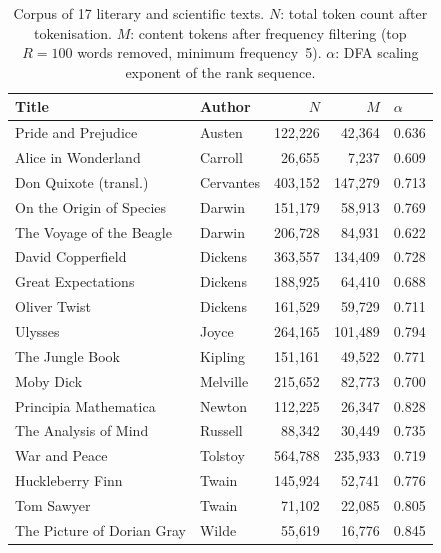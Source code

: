 \documentclass[12pt,a4paper]{article}
\begin{document}
\begin{table}[t]
\centering
\caption{Corpus of 17 literary and scientific texts.
$N$: total token count after tokenisation.
$M$: content tokens after frequency filtering
(top $R=100$ words removed, minimum frequency~5).
$\alpha$: DFA scaling exponent of the rank sequence.}
\label{tab:corpus}
\small
\begin{tabular}{llrrl}
\toprule
Title & Author & $N$ & $M$ & $\alpha$ \\
\midrule
Pride and Prejudice                      & Austen       &    122{,}226 &     42{,}364 & 0.636 \\
Alice in Wonderland                      & Carroll      &     26{,}655 &      7{,}237 & 0.609 \\
Don Quixote (transl.)                    & Cervantes    &    403{,}152 &    147{,}279 & 0.713 \\
On the Origin of Species                 & Darwin       &    151{,}179 &     58{,}913 & 0.769 \\
The Voyage of the Beagle                 & Darwin       &    206{,}728 &     84{,}931 & 0.622 \\
David Copperfield                        & Dickens      &    363{,}557 &    134{,}409 & 0.728 \\
Great Expectations                       & Dickens      &    188{,}925 &     64{,}410 & 0.688 \\
Oliver Twist                             & Dickens      &    161{,}529 &     59{,}729 & 0.711 \\
Ulysses                                  & Joyce        &    264{,}165 &    101{,}489 & 0.794 \\
The Jungle Book                          & Kipling      &    151{,}161 &     49{,}522 & 0.771 \\
Moby Dick                                & Melville     &    215{,}652 &     82{,}773 & 0.700 \\
Principia Mathematica                    & Newton       &    112{,}225 &     26{,}347 & 0.828 \\
The Analysis of Mind                     & Russell      &     88{,}342 &     30{,}449 & 0.735 \\
War and Peace                            & Tolstoy      &    564{,}788 &    235{,}933 & 0.719 \\
Huckleberry Finn                         & Twain        &    145{,}924 &     52{,}741 & 0.776 \\
Tom Sawyer                               & Twain        &     71{,}102 &     22{,}085 & 0.805 \\
The Picture of Dorian Gray               & Wilde        &     55{,}619 &     16{,}776 & 0.845 \\
\bottomrule
\end{tabular}
\end{table}
\end{document}

